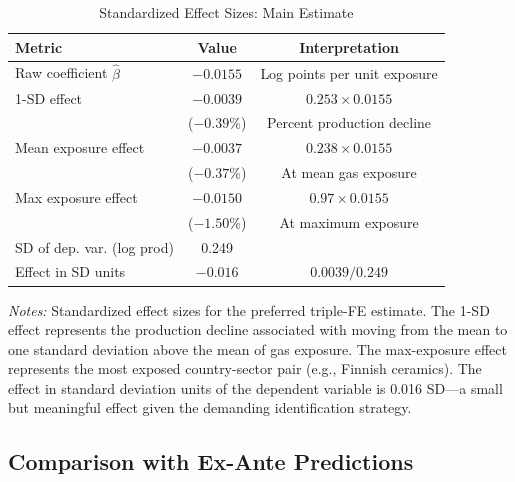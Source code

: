 \documentclass[12pt]{article}
\begin{document}
\begin{table}[htbp]
\centering
\caption{Standardized Effect Sizes: Main Estimate}
\label{tab:std_effects}
\begin{tabular}{lcc}
\hline\hline
Metric & Value & Interpretation \\
\hline
Raw coefficient $\hat{\beta}$ & $-0.0155$ & Log points per unit exposure \\
1-SD effect & $-0.0039$ & $0.253 \times 0.0155$ \\
 & ($-0.39\%$) & Percent production decline \\
Mean exposure effect & $-0.0037$ & $0.238 \times 0.0155$ \\
 & ($-0.37\%$) & At mean gas exposure \\
Max exposure effect & $-0.0150$ & $0.97 \times 0.0155$ \\
 & ($-1.50\%$) & At maximum exposure \\
\hline
SD of dep. var. (log prod) & 0.249 & \\
Effect in SD units & $-0.016$ & $0.0039 / 0.249$ \\
\hline\hline
\end{tabular}
\begin{minipage}{0.85\textwidth}
\footnotesize
\textit{Notes:} Standardized effect sizes for the preferred triple-FE estimate. The 1-SD effect represents the production decline associated with moving from the mean to one standard deviation above the mean of gas exposure. The max-exposure effect represents the most exposed country-sector pair (e.g., Finnish ceramics). The effect in standard deviation units of the dependent variable is 0.016 SD---a small but meaningful effect given the demanding identification strategy.
\end{minipage}
\end{table}

\subsection{Comparison with Ex-Ante Predictions}
\end{document}
